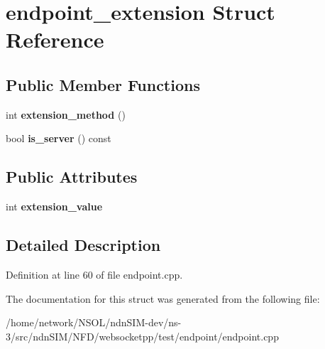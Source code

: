 \hypertarget{structendpoint__extension}{}\section{endpoint\+\_\+extension Struct Reference}
\label{structendpoint__extension}
\subsection*{Public Member Functions}
\begin{DoxyCompactItemize}
\item 
int {\bfseries extension\+\_\+method} ()\hypertarget{structendpoint__extension_a1428eb1d14f93752794f8e6cb3e8c46d}{}\label{structendpoint__extension_a1428eb1d14f93752794f8e6cb3e8c46d}

\item 
bool {\bfseries is\+\_\+server} () const\hypertarget{structendpoint__extension_a751943a818e1d15ec30df4ddbd10f3b1}{}\label{structendpoint__extension_a751943a818e1d15ec30df4ddbd10f3b1}

\end{DoxyCompactItemize}
\subsection*{Public Attributes}
\begin{DoxyCompactItemize}
\item 
int {\bfseries extension\+\_\+value}\hypertarget{structendpoint__extension_a39666e526a376c0cba7f0ab9e6795c9f}{}\label{structendpoint__extension_a39666e526a376c0cba7f0ab9e6795c9f}

\end{DoxyCompactItemize}


\subsection{Detailed Description}


Definition at line 60 of file endpoint.\+cpp.



The documentation for this struct was generated from the following file\+:\begin{DoxyCompactItemize}
\item 
/home/network/\+N\+S\+O\+L/ndn\+S\+I\+M-\/dev/ns-\/3/src/ndn\+S\+I\+M/\+N\+F\+D/websocketpp/test/endpoint/endpoint.\+cpp\end{DoxyCompactItemize}
